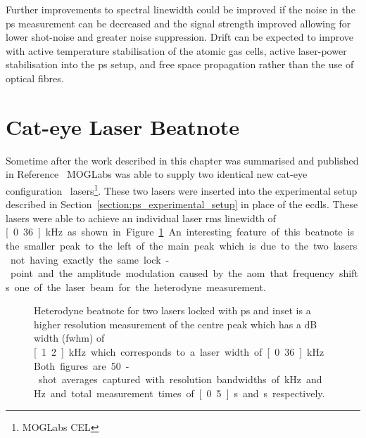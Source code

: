 Further improvements to spectral linewidth could be improved if the noise in the \gls{ps} measurement can be decreased and the signal strength improved allowing for lower shot-noise and greater noise suppression.
Drift can be expected to improve with active temperature stabilisation of the atomic gas cells, active laser-power stabilisation into the \gls{ps} setup, and free space propagation rather than the use of optical fibres.

\section{Cat-eye Laser Beatnote}

Sometime after the work described in this chapter was summarised and published in Reference~\cite{torrance_sub-kilohertz_2016} MOGLabs was able to supply two identical new cat-eye configuration~\cite{thompson_narrow_2012} lasers\footnote{MOGLabs CEL}.
These two lasers were inserted into the experimental setup described in Section~\ref{section:ps_experimental_setup} in place of the \glspl{ecdl}.
These lasers were able to achieve an individual laser \gls{rms} linewidth of \unit[0.36]{kHz} as shown in Figure~\ref{figure:cateye_beatnote}.
An interesting feature of this beatnote is the smaller peak to the left of the main peak which is due to the two lasers not having exactly the same lock-point and the amplitude modulation caused by the \gls{aom} that frequency shifts one of the laser beam for the heterodyne measurement.

\begin{figure}
\center

\caption[Heterodyne beatnote for two cat-eye lasers locked with high-bandwidth polarisation spectroscopy.]{Heterodyne beatnote for two lasers locked with \gls{ps} and inset is a higher resolution measurement of the centre peak which has a \unit[-3]{dB} width (\gls{fwhm}) of \unit[1.2]{kHz} which corresponds to a laser width of \unit[0.36]{kHz}.
Both figures are 50-shot averages captured with resolution bandwidths of \unit[30]{kHz} and \unit[100]{Hz} and total measurement times of \unit[0.5]{s} and \unit[2]{s} respectively.}
\label{figure:cateye_beatnote}
\end{figure}